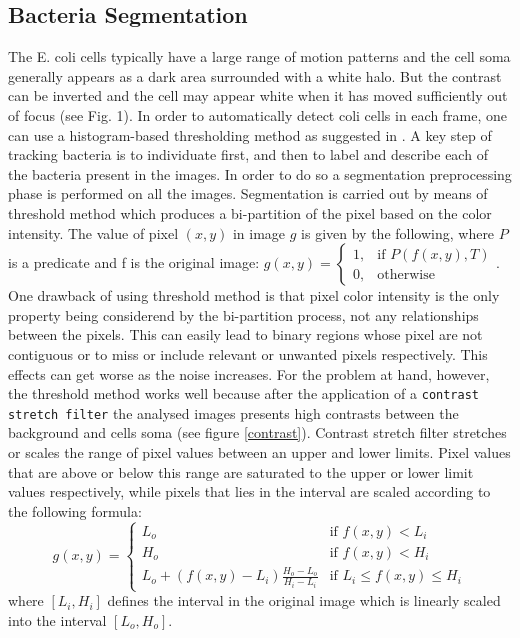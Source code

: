 \documentclass[conference]{IEEEtran}
\begin{document}
\subsection{Bacteria Segmentation}
The E. coli cells typically have a large range of motion patterns
and the cell soma generally appears as a dark area surrounded
with a white halo. But the contrast can be inverted
and the cell may appear white when it has moved sufficiently
out of focus (see Fig. 1). In order to automatically detect coli
cells in each frame, one can use a histogram-based thresholding
method as suggested in \cite{Cho:1989}.
A key step of tracking bacteria is to individuate first, and then to label and describe each of the bacteria present in the images. In order to do so a segmentation preprocessing phase is performed on all the images. 
Segmentation  is carried out by means of threshold method \cite{Shapiro:2002} which produces a bi-partition of the pixel based on the color intensity. The value of pixel $(x,y)$ in image $g$ is given by the following, where $P$ is a predicate and f is the original image:
${g(x,y) = \begin{cases} 1, & \mbox{if } P(f(x,y),T) \\ 0, & \mbox{otherwise }\end{cases}}$.
One drawback of using threshold method is that pixel color intensity is the only property being considerend by the bi-partition process, not any relationships between the pixels. This can easily lead to binary regions whose pixel are not contiguous or to miss or include relevant or unwanted pixels respectively. This effects can get worse as the noise increases. For the problem at hand, however, the threshold method works well because after the application of a \texttt{contrast stretch filter} the analysed images presents high contrasts between the background and cells soma (see figure \ref{contrast}). Contrast stretch filter  stretches or scales the range of pixel values between an upper and lower limits. Pixel values that are above or below this range are saturated to the upper or lower limit values respectively, while pixels that lies in the interval are scaled according to the following formula: 
\[{g(x,y) = \begin{cases} L_o & \mbox{if } f(x,y) < L_i \\  H_o & \mbox{if } f(x,y) < H_i\\ L_o + (f(x,y)-L_i)\frac{H_o-L_o}{H_i-L_i} & \mbox{if } L_i \leq f(x,y) \leq H_i\end{cases}}\] where  $[L_i,H_i]$ defines the interval in the original image which is linearly scaled into the interval $[L_o,H_o]$.
\end{document}
